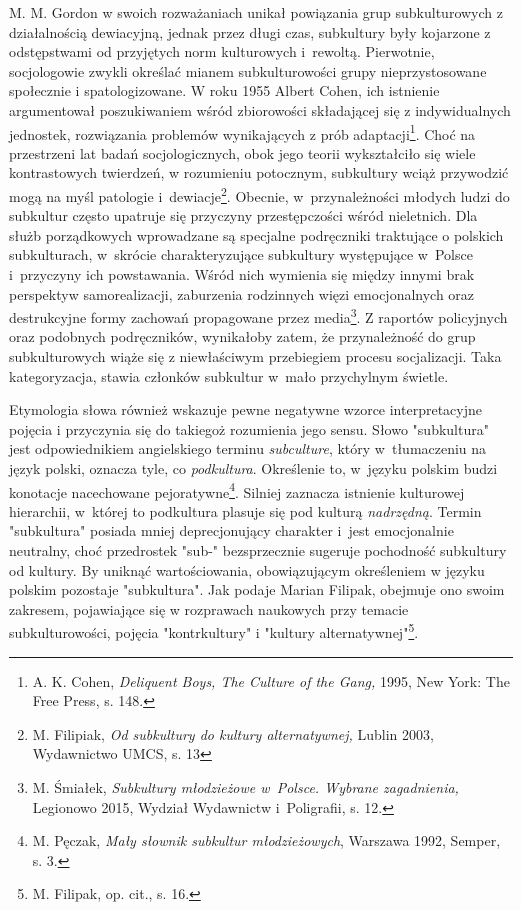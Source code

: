 \documentclass[12pt, a4paper, titlepage]{report}
\begin{document}
M. M. Gordon w swoich rozważaniach unikał powiązania grup subkulturowych z działalnością dewiacyjną, jednak przez długi czas, subkultury były kojarzone z odstępstwami od przyjętych norm kulturowych i~rewoltą. Pierwotnie, socjologowie zwykli określać mianem subkulturowości grupy nieprzystosowane społecznie i spatologizowane. W roku 1955 Albert Cohen, ich istnienie argumentował poszukiwaniem wśród zbiorowości składającej się z indywidualnych jednostek, rozwiązania problemów wynikających z prób adaptacji\footnote{A. K. Cohen, \textit{Deliquent Boys, The Culture of the Gang,} 1995, New York: The Free Press, s. 148.}. Choć na przestrzeni lat badań socjologicznych, obok jego teorii wykształciło się wiele kontrastowych twierdzeń, w rozumieniu potocznym, subkultury wciąż przywodzić mogą na myśl patologie i~dewiacje\footnote{M. Filipiak, \textit{Od subkultury do kultury alternatywnej,} Lublin 2003, Wydawnictwo UMCS, s. 13}. Obecnie, w~przynależności młodych ludzi do subkultur często upatruje się przyczyny przestępczości wśród nieletnich. Dla służb porządkowych wprowadzane są specjalne podręczniki traktujące o polskich subkulturach, w~skrócie charakteryzujące subkultury występujące w~Polsce i~przyczyny ich powstawania. Wśród nich wymienia się między innymi brak perspektyw samorealizacji, zaburzenia rodzinnych więzi emocjonalnych oraz destrukcyjne formy zachowań propagowane przez media\footnote{M. Śmiałek, \textit{Subkultury młodzieżowe w~Polsce. Wybrane zagadnienia,} Legionowo 2015, Wydział Wydawnictw i~Poligrafii, s. 12.}. Z raportów policyjnych oraz podobnych podręczników, wynikałoby zatem, że przynależność do grup subkulturowych wiąże się z niewłaściwym przebiegiem procesu socjalizacji. Taka kategoryzacja, stawia członków subkultur w~mało przychylnym świetle. 

Etymologia słowa również wskazuje pewne negatywne wzorce interpretacyjne pojęcia i przyczynia się do takiegoż rozumienia jego sensu. Słowo "subkultura" jest odpowiednikiem angielskiego terminu \textit{subculture}, który w~tłumaczeniu na język polski, oznacza tyle, co \textit{podkultura}. Określenie to, w~języku polskim budzi konotacje nacechowane pejoratywne\footnote{M. Pęczak, \textit{Mały słownik subkultur młodzieżowych}, Warszawa 1992, Semper, s. 3.}. Silniej zaznacza istnienie kulturowej hierarchii, w~której to podkultura plasuje się pod kulturą \textit{nadrzędną}. Termin "subkultura" posiada mniej deprecjonujący charakter i~jest emocjonalnie neutralny, choć przedrostek "sub-" bezsprzecznie sugeruje pochodność subkultury od kultury. By uniknąć wartościowania, obowiązującym określeniem w języku polskim pozostaje "subkultura". Jak podaje Marian Filipak, obejmuje ono swoim zakresem, pojawiające się w rozprawach naukowych przy temacie subkulturowości, pojęcia "kontrkultury" i "kultury alternatywnej"\footnote{M. Filipak, op. cit., s. 16.}.
\end{document}
